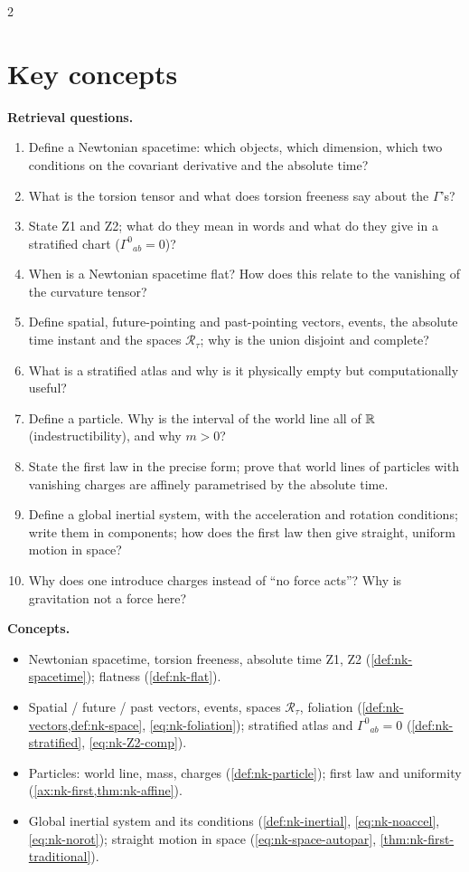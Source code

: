 \begin{paracol}{2}
\section*{Key concepts}
\begin{keyconcepts}
\textbf{Retrieval questions.}
\begin{enumerate}
  \item Define a Newtonian spacetime: which objects, which dimension, which two conditions on the covariant derivative and the absolute time?
  \item What is the torsion tensor and what does torsion freeness say about the $\Gamma$'s?
  \item State Z1 and Z2; what do they mean in words and what do they give in a stratified chart ($\Gamma^0{}_{ab}=0$)?
  \item When is a Newtonian spacetime flat? How does this relate to the vanishing of the curvature tensor?
  \item Define spatial, future-pointing and past-pointing vectors, events, the absolute time instant and the spaces $\mathcal R_\tau$; why is the union disjoint and complete?
  \item What is a stratified atlas and why is it physically empty but computationally useful?
  \item Define a particle. Why is the interval of the world line all of $\mathbb{R}$ (indestructibility), and why $m>0$?
  \item State the first law in the precise form; prove that world lines of particles with vanishing charges are affinely parametrised by the absolute time.
  \item Define a global inertial system, with the acceleration and rotation conditions; write them in components; how does the first law then give straight, uniform motion in space?
  \item Why does one introduce charges instead of ``no force acts''? Why is gravitation not a force here?
\end{enumerate}
\textbf{Concepts.}
\begin{itemize}
  \item Newtonian spacetime, torsion freeness, absolute time Z1, Z2 (\cref{def:nk-spacetime}); flatness (\cref{def:nk-flat}).
  \item Spatial / future / past vectors, events, spaces $\mathcal R_\tau$, foliation (\cref{def:nk-vectors,def:nk-space}, \eqref{eq:nk-foliation}); stratified atlas and $\Gamma^0{}_{ab}=0$ (\cref{def:nk-stratified}, \eqref{eq:nk-Z2-comp}).
  \item Particles: world line, mass, charges (\cref{def:nk-particle}); first law and uniformity (\cref{ax:nk-first,thm:nk-affine}).
  \item Global inertial system and its conditions (\cref{def:nk-inertial}, \eqref{eq:nk-noaccel}, \eqref{eq:nk-norot}); straight motion in space (\eqref{eq:nk-space-autopar}, \cref{thm:nk-first-traditional}).
\end{itemize}
\end{keyconcepts}

\flushside
\end{paracol}
